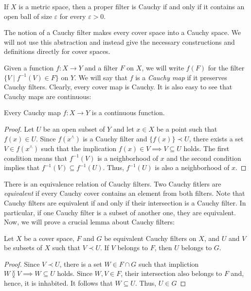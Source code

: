 \documentclass[reqno]{amsart}
\theoremstyle{definition}
\theoremstyle{remark}
\numberwithin{figure}{section}
\newcommand{\overlap}[2]{#1 \between #2}
\newcommand{\rb}{\prec}
\begin{document}
\begin{cor}
If $X$ is a metric space, then a proper filter is Cauchy if and only if it contains an open ball of size $\varepsilon$ for every $\varepsilon > 0$.
\end{cor}

The notion of a Cauchy filter makes every cover space into a Cauchy space. %
We will not use this abstraction and instead give the necessary constructions and definitions directly for cover spaces.

Given a function $f : X \to Y$ and a filter $F$ on $X$, we will write $f(F)$ for the filter $\{ V \mid f^{-1}(V) \in F \}$ on $Y$.
We will say that $f$ is a \emph{Cauchy map} if it preserves Cauchy filters.
Clearly, every cover map is Cauchy.
It is also easy to see that Cauchy maps are continuous:

\begin{prop}
Every Cauchy map $f : X \to Y$ is a continuous function.
\end{prop}
\begin{proof}
Let $U$ be an open subset of $Y$ and let $x \in X$ be a point such that $f(x) \in U$.
Since $f(x^\wedge)$ is a Cauchy filter and $\{ f(x) \} \rb U$, there exists a set $V \in f(x^\wedge)$ such that the implication $f(x) \in V \implies V \subseteq U$ holds.
The first condition means that $f^{-1}(V)$ is a neighborhood of $x$ and the second condition implies that $f^{-1}(V) \subseteq f^{-1}(U)$.
Thus, $f^{-1}(U)$ is also a neighborhood of $x$.
\end{proof}

There is an equivalence relation of Cauchy filters.
Two Cauchy fitlers are \emph{equivalent} if every Cauchy cover contains an element from both filters.
Note that Cauchy filters are equivalent if and only if their intersection is a Cauchy filter.
In particular, if one Cauchy filter is a subset of another one, they are equivalent.
Now, we will prove a crucial lemma about Cauchy filters:

\begin{lem}
Let $X$ be a cover space, $F$ and $G$ be equivalent Cauchy filters on $X$, and $U$ and $V$ be subsets of $X$ such that $V \rb U$.
If $V$ belongs to $F$, then $U$ belongs to $G$.
\end{lem}
\begin{proof}
Since $V \rb U$, there is a set $W \in F \cap G$ such that impliction $\overlap{W}{V} \implies W \subseteq U$ holds.
Since $W,V \in F$, their intersection also belongs to $F$ and, hence, it is inhabited.
It follows that $W \subseteq U$.
Thus, $U \in G$
\end{proof}
\end{document}
